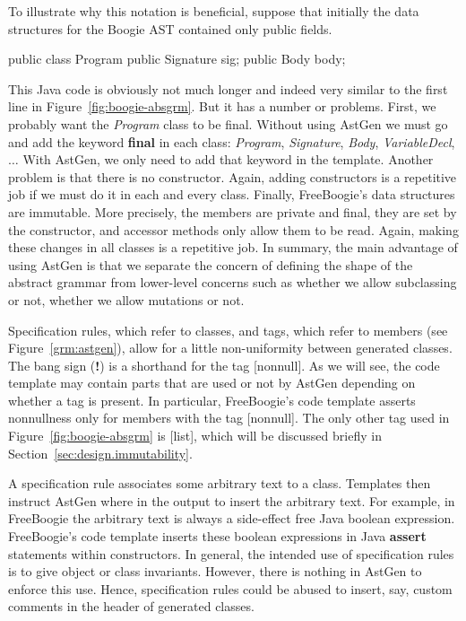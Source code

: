 \documentclass{llncs}
\begin{document}
To illustrate why this notation is beneficial, suppose that
initially the data structures for the Boogie AST contained only
public fields.
\begin{jml}
public class Program {
  public Signature sig;
  public Body body;
}
\end{jml}
This Java code is obviously not much longer and indeed very
similar to the first line in Figure~\ref{fig:boogie-absgrm}.
But it has a number or problems. First, we probably want the
\textit{Program} class to be final. Without using AstGen
we must go and add the keyword \textbf{final} in each
class: \textit{Program}, \textit{Signature}, \textit{Body},
\textit{VariableDecl}, $\ldots$ With AstGen, we only need to add
that keyword in the template. Another problem is that there is no
constructor. Again, adding constructors is a repetitive job if we
must do it in each and every class. Finally, FreeBoogie's data
structures are immutable. More precisely, the members are private
and final, they are set by the constructor, and accessor methods
only allow them to be read. Again, making these changes in all
classes is a repetitive job. In summary, the main advantage of
using AstGen is that we separate the concern of defining the
shape of the abstract grammar from lower-level concerns such as
whether we allow subclassing or not, whether we allow mutations
or not.

Specification rules, which refer to classes, and tags, which
refer to members (see Figure~\ref{grm:astgen}), allow for a
little non-uniformity between generated classes. The bang
sign (\textbf{!}) is a shorthand for the tag [nonnull]. As we
will see, the code template may contain parts that are used
or not by AstGen depending on whether a tag is present. In
particular, FreeBoogie's code template asserts nonnullness only
for members with the tag [nonnull]. The only other tag used in
Figure~\ref{fig:boogie-absgrm} is [list], which will be discussed
briefly in Section~\ref{sec:design.immutability}.

A specification rule associates some arbitrary text to a class.
Templates then instruct AstGen where in the output to insert
the arbitrary text. For example, in FreeBoogie the arbitrary
text is always a side-effect free Java boolean expression.
FreeBoogie's code template inserts these boolean expressions in
Java \textbf{assert} statements within constructors. In general,
the intended use of specification rules is to give object or
class invariants. However, there is nothing in AstGen to enforce
this use. Hence, specification rules could be abused to insert,
say, custom comments in the header of generated classes.
\end{document}

